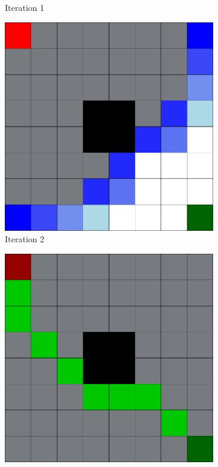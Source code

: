 \begin{figure}[h!]
\begin{subfigure}[b]{0.2\linewidth}
     \caption{Iteration 1}
  \end{subfigure}
  \hfill
  \begin{subfigure}[b]{0.2\linewidth}
    \includegraphics[width=\linewidth]{images/dijkstra2.png}
    \caption{Iteration 2}
  \end{subfigure}
  \hfill
  \begin{subfigure}[b]{0.2\linewidth}
    \includegraphics[width=\linewidth]{images/dijkstra3.png}

\end{subfigure}
\end{figure}
